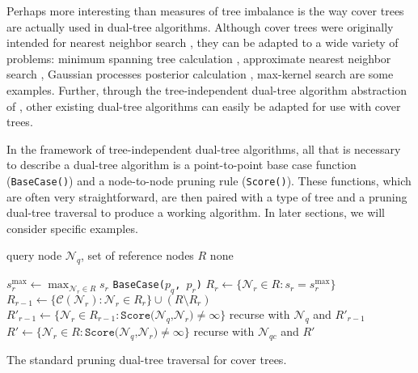 Perhaps more interesting than measures of tree imbalance is the way cover trees
are actually used in dual-tree algorithms.  Although cover trees were originally
intended for nearest neighbor search \citep*[see Algorithm
\texttt{Find-All-Nearest},][]{langford2006}, they can be adapted to a wide
variety of problems: minimum
spanning tree calculation \citep{march2010euclidean}, approximate nearest neighbor
search \citep{ram2009rank}, Gaussian processes posterior calculation
\citep{moore2014fast}, max-kernel search \citep{curtin2014dual} are some
examples.  Further, through the tree-independent dual-tree algorithm abstraction
of \citet{curtin2013tree}, other existing dual-tree algorithms can easily be
adapted for use with cover trees.

In the framework of tree-independent dual-tree algorithms, all that is necessary
to describe a dual-tree algorithm is a point-to-point base case function
(\texttt{BaseCase()}) and a node-to-node pruning rule (\texttt{Score()}).  These
functions, which are often very straightforward, are then paired with a type of
tree and a pruning dual-tree traversal to produce a working algorithm.  In later
sections, we will consider specific examples.

\begin{algorithm}[tb]
  \begin{algorithmic}[1]
     query node $\mathscr{N}_q$, set of reference nodes
$R$ \label{alg:line:ct-dual-input}
     none

    \medskip
    \STATE $s^{\max}_r \gets \max_{\mathscr{N}_r \in R} s_r$
\label{alg:line:ct-dual-srmax}
\label{alg:line:ct-dual-ref-recursion-start}
       \label{alg:line:ct-dual-base-case-start}
        \STATE \texttt{BaseCase($p_q$, $p_r$)}
      \ENDFOR \label{alg:line:ct-dual-base-case-end}
      \STATE $R_r \gets \{ \mathscr{N}_r \in R : s_r = s^{\max}_r \}$
\label{alg:line:ct-dual-ref-set}
      \STATE $R_{r - 1} \gets \{ \mathscr{C}(\mathscr{N}_r) : \mathscr{N}_r \in
R_r \} \cup (R \setminus R_r)$ \label{alg:line:ct-dual-ref-children}
      \STATE $R'_{r - 1} \gets \{ \mathscr{N}_r \in R_{r - 1} :
\texttt{Score(}\mathscr{N}_q\texttt{,} \mathscr{N}_r\texttt{)} \ne \infty \}$
\label{alg:line:ct-dual-ref-score}
      \STATE recurse with $\mathscr{N}_q$ and $R'_{r - 1}$
\label{alg:line:ct-dual-ref-recursion-end}
    \ELSE \label{alg:line:ct-dual-query-recursion-start}
        \STATE $R' \gets \{ \mathscr{N}_r \in R :
\texttt{Score(}\mathscr{N}_q\texttt{,} \mathscr{N}_r\texttt{)} \ne \infty \}$
\label{alg:line:ct-dual-query-pruning}
        \STATE recurse with $\mathscr{N}_{qc}$ and $R'$
\label{alg:line:ct-dual-query-recursion}
      \ENDFOR \label{alg:line:ct-dual-query-recursion-end}
    \ENDIF
  \end{algorithmic}
  \caption{The standard pruning dual-tree traversal for cover trees.}
  \label{alg:cover-tree-dual}
\end{algorithm}

